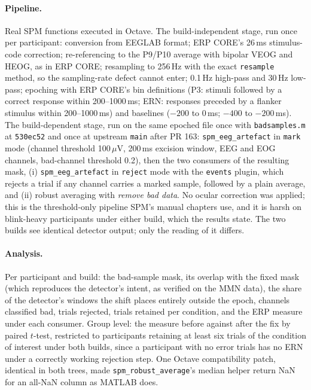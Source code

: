 \documentclass[11pt]{article}
\newcommand{\code}[1]{\texttt{#1}}
\begin{document}
\paragraph{Pipeline.} Real SPM functions executed in Octave. The build-independent stage, run once per participant: conversion from EEGLAB format; ERP CORE's 26\,ms stimulus-code correction; re-referencing to the P9/P10 average with bipolar VEOG and HEOG, as in ERP CORE; resampling to 256\,Hz with the exact \code{resample} method, so the sampling-rate defect cannot enter; 0.1\,Hz high-pass and 30\,Hz low-pass; epoching with ERP CORE's bin definitions (P3: stimuli followed by a correct response within 200--1000\,ms; ERN: responses preceded by a flanker stimulus within 200--1000\,ms) and baselines ($-200$ to 0\,ms; $-400$ to $-200$\,ms). The build-dependent stage, run on the same epoched file once with \code{badsamples.m} at \code{530ec52} and once at upstream \code{main} after PR 163: \code{spm\_eeg\_artefact} in \code{mark} mode (channel threshold 100\,$\mu$V, 200\,ms excision window, EEG and EOG channels, bad-channel threshold 0.2), then the two consumers of the resulting mask, (i) \code{spm\_eeg\_artefact} in \code{reject} mode with the \code{events} plugin, which rejects a trial if any channel carries a marked sample, followed by a plain average, and (ii) robust averaging with \emph{remove bad data}. No ocular correction was applied; this is the threshold-only pipeline SPM's manual chapters use, and it is harsh on blink-heavy participants under either build, which the results state. The two builds see identical detector output; only the reading of it differs.

\paragraph{Analysis.} Per participant and build: the bad-sample mask, its overlap with the fixed mask (which reproduces the detector's intent, as verified on the MMN data), the share of the detector's windows the shift places entirely outside the epoch, channels classified bad, trials rejected, trials retained per condition, and the ERP measure under each consumer. Group level: the measure before against after the fix by paired $t$-test, restricted to participants retaining at least six trials of the condition of interest under both builds, since a participant with no error trials has no ERN under a correctly working rejection step. One Octave compatibility patch, identical in both trees, made \code{spm\_robust\_average}'s median helper return NaN for an all-NaN column as MATLAB does.
\end{document}
